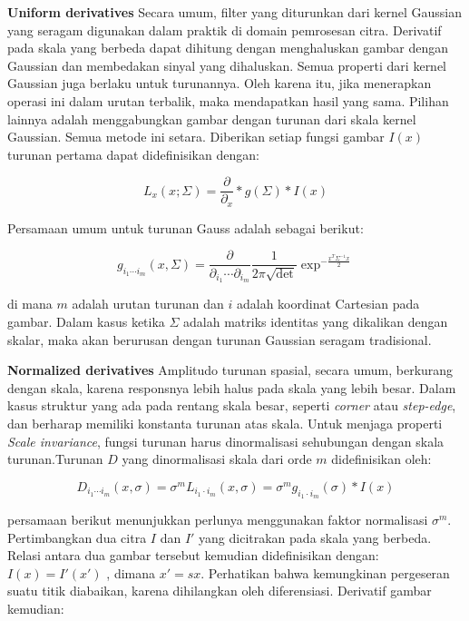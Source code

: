 \textbf{Uniform derivatives} Secara umum, filter yang diturunkan dari kernel Gaussian yang 
seragam digunakan dalam praktik di domain pemrosesan citra. Derivatif pada skala yang berbeda 
dapat dihitung dengan menghaluskan gambar dengan Gaussian dan membedakan sinyal yang 
dihaluskan. Semua properti dari kernel Gaussian juga berlaku untuk turunannya. 
Oleh karena itu, jika menerapkan operasi ini dalam urutan terbalik, maka mendapatkan 
hasil yang sama. Pilihan lainnya adalah menggabungkan gambar dengan turunan dari 
skala kernel Gaussian. Semua metode ini setara. 
Diberikan setiap fungsi gambar \(I(x)\)turunan pertama dapat didefinisikan dengan:

\begin{equation*}
  L_{x}(x;\Sigma) = \frac{\partial}{\partial_{x}} * g(\Sigma) * I(x)
\end{equation*}

Persamaan umum untuk turunan Gauss adalah sebagai berikut:

\begin{equation*}
  g_{i_{1}\cdots i_{m}}(x,\Sigma) =\frac{\partial}{\partial_{i_{1}}\cdots \partial_{i_{m}}}\frac{1}{2\pi\sqrt{\det}}\exp^{-\frac{x^{T}\Sigma^{-1}x}{2}}
\end{equation*}

di mana \(m\) adalah urutan turunan dan \(i\) adalah koordinat Cartesian pada gambar. 
Dalam kasus ketika \(\Sigma\) adalah matriks identitas yang dikalikan dengan skalar, maka akan 
berurusan dengan turunan Gaussian seragam tradisional. 

\textbf{Normalized derivatives} Amplitudo turunan spasial, secara umum, berkurang dengan skala, 
karena responsnya lebih halus pada skala yang lebih besar. Dalam kasus struktur yang ada pada rentang 
skala besar, seperti \emph{corner} atau \emph{step-edge}, dan berharap memiliki konstanta turunan 
atas skala. Untuk menjaga properti \emph{Scale invariance}, fungsi turunan harus dinormalisasi 
sehubungan dengan skala turunan.Turunan \(D\) yang dinormalisasi skala dari orde \(m\) didefinisikan oleh:

\begin{equation*}
  D_{i_{1}\cdots i_{m}}(x,\sigma) = \sigma^{m}L_{i_{1} \cdot i_{m}}(x,\sigma) = \sigma^{m}g_{i_{1}\cdot i_{m}}(\sigma)*I(x)
\end{equation*}

persamaan berikut menunjukkan perlunya menggunakan faktor normalisasi \(\sigma^{m}\). 
Pertimbangkan dua citra \(I\) dan \(I'\) yang dicitrakan pada skala yang berbeda.
Relasi antara dua gambar tersebut kemudian didefinisikan dengan: \(I(x) = I'(x')\) , 
dimana \(x' = sx\). Perhatikan bahwa kemungkinan pergeseran suatu titik diabaikan, 
karena dihilangkan oleh diferensiasi. Derivatif gambar kemudian:


